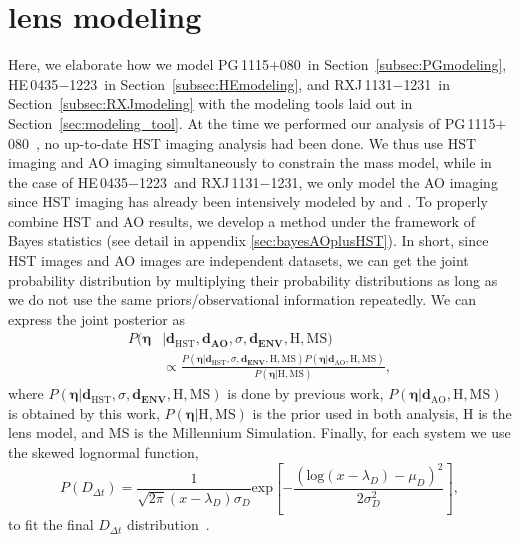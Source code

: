 \documentclass[useAMS,usenatbib]{mnras}
\newcommand\rxj{RXJ\,1131$-$1231}
\newcommand\he{HE\,0435$-$1223}
\newcommand\pg{PG\,1115$+$080}
\newcommand{\sref}[1]{Section~\ref{#1}}
\newcommand{\Ddt}{D_{\Delta t}}
\begin{document}
\section{lens modeling}
\label{sec:lens_modeling}
Here, we elaborate how we model \pg~in \sref{subsec:PGmodeling}, \he~in \sref{subsec:HEmodeling}, and \rxj~in \sref{subsec:RXJmodeling} with the modeling tools laid out in \sref{sec:modeling_tool}.
At the time we performed our analysis of \pg~, no up-to-date HST imaging analysis had been done. We thus use HST imaging and AO imaging simultaneously to constrain the mass model, while in the case of \he~and \rxj, we only model the AO imaging since HST imaging has already been intensively modeled by \citet{WongEtal17} and \citet{SuyuEtal14}. To properly combine HST and AO results, we develop a method under the framework of Bayes statistics (see detail in appendix \ref{sec:bayesAOplusHST}). In short,
since HST images and AO images are independent datasets, we can get the joint probability distribution by multiplying their probability distributions as long as we do not use the same priors/observational information repeatedly. 
We can express the joint posterior as
\begin{equation}
\label{joint}
\begin{split}
P(\bm{\eta}&|\bm{d}_{\textrm{HST}},\bm{\bm{d}_{\textrm{AO}}},\sigma, \bm{d_{\textrm{ENV}}},\textrm{H},\textrm{MS})\\
&\propto \frac{P(\bm{\eta}|\bm{d}_{\textrm{HST}},\sigma, \bm{d_{\textrm{ENV}}},\textrm{H},\textrm{MS})P(\bm{\eta}|\bm{d}_{\textrm{AO}},\textrm{H},\textrm{MS})}{P(\bm{\eta}|\textrm{H},\textrm{MS})},
\end{split}
\end{equation}
where $P(\bm{\eta}|\bm{d}_{\textrm{HST}},\sigma,\bm{d_{\textrm{ENV}}},\textrm{H},\textrm{MS})$ is done by previous work, $P(\bm{\eta}|\bm{d}_{\textrm{AO}},\textrm{H},\textrm{MS})$ is obtained by this work, $P(\bm{\eta}|\textrm{H},\textrm{MS})$ is the prior used in both analysis, H is the lens model, and MS is the Millennium Simulation. 
Finally, for each system we use the skewed lognormal function,
\begin{equation}
\label{eq:lognormal}
P(\Ddt)=\frac{1}{\sqrt{2\pi}(x-\lambda_{D})\sigma_{D}}\text{exp}\left[-\frac{(\text{log}(x-\lambda_{D})-\mu_{D})^{2}}{2\sigma_{D}^{2}}\right],
\end{equation}
to fit the final $\Ddt$ distribution~\citep{SuyuEtal10,WongEtal17,BonvinEtal17}.
\end{document}
